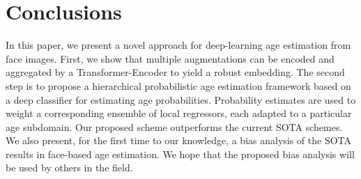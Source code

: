 \documentclass[10pt,journal]{IEEEtran}\usepackage{amsfonts}
\begin{document}
\section{Conclusions}

In this paper, we present a novel approach for deep-learning age estimation
from face images. First, we show that multiple augmentations can be encoded
and aggregated by a Transformer-Encoder to yield a robust embedding. The
second step is to propose a hierarchical probabilistic age estimation
framework based on a deep classifier for estimating age probabilities.
Probability estimates are used to weight a corresponding ensemble of local
regressors, each adapted to a particular age subdomain. Our proposed scheme
outperforms the current SOTA schemes. We also present, for the first time to
our knowledge, a bias analysis of the SOTA results in face-based age
estimation. We hope that the proposed bias analysis will be used by others in
the field.

\balance
{\small


}
\end{document}
